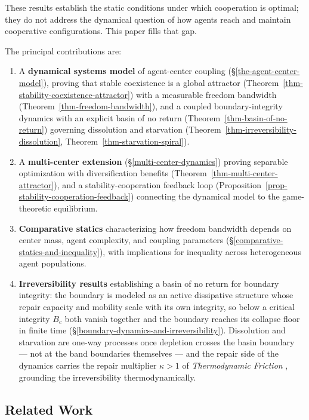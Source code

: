 \documentclass[11pt]{article}
\theoremstyle{plain}
\theoremstyle{definition}
\theoremstyle{remark}
\let\origsubsection\subsection
\renewcommand{\subsection}{\needspace{7\baselineskip}\origsubsection}
\begin{document}
These results establish the static conditions under which cooperation is
optimal; they do not address the dynamical question of how agents reach
and maintain cooperative configurations. This paper fills that gap.

The principal contributions are:

\begin{enumerate}
\def\labelenumi{\arabic{enumi}.}
\item
  A \textbf{dynamical systems model} of agent-center coupling
  (§\ref{the-agent-center-model}), proving that stable coexistence is a
  global attractor (Theorem~\ref{thm-stability-coexistence-attractor})
  with a measurable freedom bandwidth
  (Theorem~\ref{thm-freedom-bandwidth}), and a coupled
  boundary-integrity dynamics with an explicit basin of no return
  (Theorem~\ref{thm-basin-of-no-return}) governing dissolution and
  starvation (Theorem~\ref{thm-irreversibility-dissolution},
  Theorem~\ref{thm-starvation-spiral}).
\item
  A \textbf{multi-center extension} (§\ref{multi-center-dynamics})
  proving separable optimization with diversification benefits
  (Theorem~\ref{thm-multi-center-attractor}), and a
  stability-cooperation feedback loop
  (Proposition~\ref{prop-stability-cooperation-feedback}) connecting the
  dynamical model to the game-theoretic equilibrium.
\item
  \textbf{Comparative statics} characterizing how freedom bandwidth
  depends on center mass, agent complexity, and coupling parameters
  (§\ref{comparative-statics-and-inequality}), with implications for
  inequality across heterogeneous agent populations.
\item
  \textbf{Irreversibility results} establishing a basin of no return for
  boundary integrity: the boundary is modeled as an active dissipative
  structure whose repair capacity and mobility scale with its own
  integrity, so below a critical integrity \(B_c\) both vanish together
  and the boundary reaches its collapse floor in finite time
  (§\ref{boundary-dynamics-and-irreversibility}). Dissolution and
  starvation are one-way processes once depletion crosses the basin
  boundary --- not at the band boundaries themselves --- and the repair
  side of the dynamics carries the repair multiplier \(\kappa > 1\) of
  \emph{Thermodynamic Friction} \citep{TC-IV}, grounding the
  irreversibility thermodynamically.
\end{enumerate}

\subsection{Related Work}\label{related-work}
\end{document}
